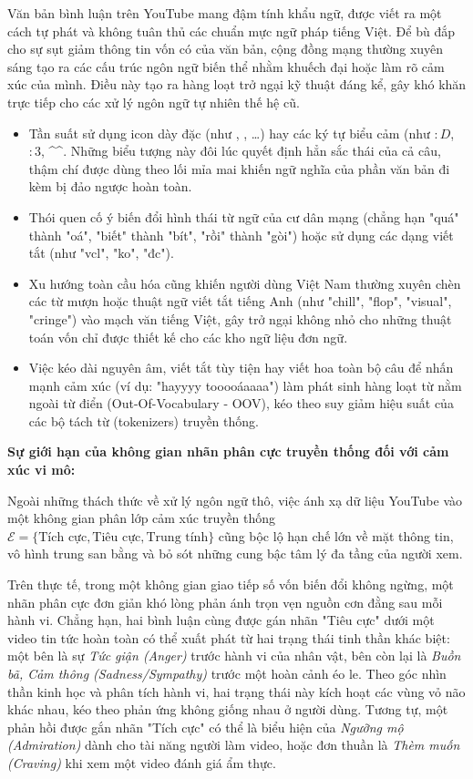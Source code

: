 Văn bản bình luận trên YouTube mang đậm tính khẩu ngữ, được viết ra một cách tự phát và không tuân thủ các chuẩn mực ngữ pháp tiếng Việt. Để bù đắp cho sự sụt giảm thông tin vốn có của văn bản, cộng đồng mạng thường xuyên sáng tạo ra các cấu trúc ngôn ngữ biến thể nhằm khuếch đại hoặc làm rõ cảm xúc của mình. Điều này tạo ra hàng loạt trở ngại kỹ thuật đáng kể, gây khó khăn trực tiếp cho các xử lý ngôn ngữ tự nhiên thế hệ cũ.
\begin{itemize}[label=-]
    \item Tần suất sử dụng icon dày đặc (như , , \dots) hay các ký tự biểu cảm (như $:D$, $:3$, \textasciicircum{}\textasciicircum{}. Những biểu tượng này đôi lúc quyết định hẳn sắc thái của cả câu, thậm chí được dùng theo lối mỉa mai khiến ngữ nghĩa của phần văn bản đi kèm bị đảo ngược hoàn toàn.
    \item Thói quen cố ý biến đổi hình thái từ ngữ của cư dân mạng (chẳng hạn "quá" thành "oá", "biết" thành "bít", "rồi" thành "gòi") hoặc sử dụng các dạng viết tắt (như "vcl", "ko", "đc").
    \item Xu hướng toàn cầu hóa cũng khiến người dùng Việt Nam thường xuyên chèn các từ mượn hoặc thuật ngữ viết tắt tiếng Anh (như "chill", "flop", "visual", "cringe") vào mạch văn tiếng Việt, gây trở ngại không nhỏ cho những thuật toán vốn chỉ được thiết kế cho các kho ngữ liệu đơn ngữ.
    \item Việc kéo dài nguyên âm, viết tắt tùy tiện hay viết hoa toàn bộ câu để nhấn mạnh cảm xúc (ví dụ: "hayyyy tooooáaaaa") làm phát sinh hàng loạt từ nằm ngoài từ điển (Out-Of-Vocabulary - OOV), kéo theo suy giảm hiệu suất của các bộ tách từ (tokenizers) truyền thống.
\end{itemize}

\textbf{Sự giới hạn của không gian nhãn phân cực truyền thống đối với cảm xúc vi mô:}

Ngoài những thách thức về xử lý ngôn ngữ thô, việc ánh xạ dữ liệu YouTube vào một không gian phân lớp cảm xúc truyền thống $\mathcal{E} = \{\text{Tích cực}, \text{Tiêu cực}, \text{Trung tính}\}$ cũng bộc lộ hạn chế lớn về mặt thông tin, vô hình trung san bằng và bỏ sót những cung bậc tâm lý đa tầng của người xem.

Trên thực tế, trong một không gian giao tiếp số vốn biến đổi không ngừng, một nhãn phân cực đơn giản khó lòng phản ánh trọn vẹn nguồn cơn đằng sau mỗi hành vi. Chẳng hạn, hai bình luận cùng được gán nhãn "Tiêu cực" dưới một video tin tức hoàn toàn có thể xuất phát từ hai trạng thái tinh thần khác biệt: một bên là sự \textit{Tức giận (Anger)} trước hành vi của nhân vật, bên còn lại là \textit{Buồn bã, Cảm thông (Sadness/Sympathy)} trước một hoàn cảnh éo le. Theo góc nhìn thần kinh học và phân tích hành vi, hai trạng thái này kích hoạt các vùng vỏ não khác nhau, kéo theo phản ứng không giống nhau ở người dùng. Tương tự, một phản hồi được gắn nhãn "Tích cực" có thể là biểu hiện của \textit{Ngưỡng mộ (Admiration)} dành cho tài năng người làm video, hoặc đơn thuần là \textit{Thèm muốn (Craving)} khi xem một video đánh giá ẩm thực.

